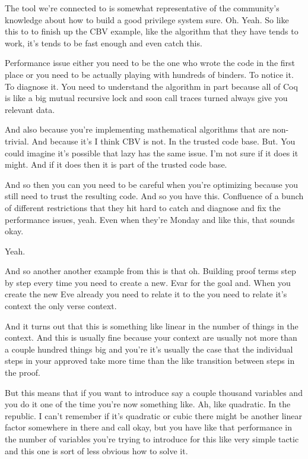 \begin{subappendices}
    The tool we're connected to is somewhat representative of the community's knowledge about how to build a good privilege system sure. Oh. Yeah. So like this to to finish up the CBV example, like the algorithm that they have tends to work, it's tends to be fast enough and even catch this. 
    
    Performance issue either you need to be the one who wrote the code in the first place or you need to be actually playing with hundreds of binders. To notice it. To diagnose it. You need to understand the algorithm in part because all of Coq is like a big mutual recursive lock and soon call traces turned always give you relevant data. 
    
    And also because you're implementing mathematical algorithms that are non-trivial. And because it's I think CBV is not. In the trusted code base. But. You could imagine it's possible that lazy has the same issue. I'm not sure if it does it might. And if it does then it is part of the trusted code base. 
    
    And so then you can you need to be careful when you're optimizing because you still need to trust the resulting code. And so you have this. Confluence of a bunch of different restrictions that they hit hard to catch and diagnose and fix the performance issues, yeah. Even when they're Monday and like this, that sounds okay. 
    
    Yeah. 
    
    And so another another example from this is that oh. Building proof terms step by step every time you need to create a new. Evar for the goal and. When you create the new Eve already you need to relate it to the you need to relate it's context the only verse context. 
    
    And it turns out that this is something like linear in the number of things in the context. And this is usually fine because your context are usually not more than a couple hundred things big and you're it's usually the case that the individual steps in your approved take more time than the like transition between steps in the proof. 
    
    But this means that if you want to introduce say a couple thousand variables and you do it one of the time you're now something like. Ah, like quadratic. In the republic. I can't remember if it's quadratic or cubic there might be another linear factor somewhere in there and call okay, but you have like that performance in the number of variables you're trying to introduce for this like very simple tactic and this one is sort of less obvious how to solve it. 
    

\end{subappendices}
